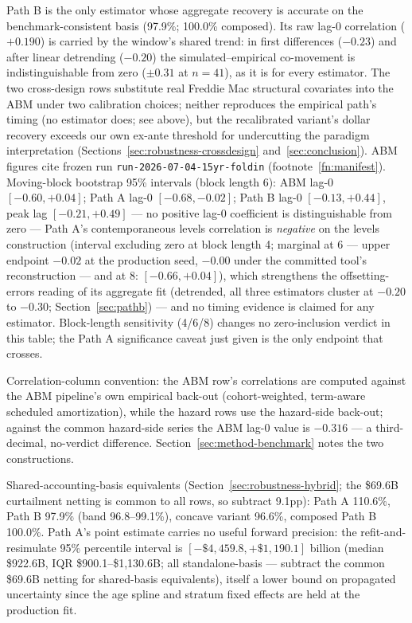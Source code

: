 \documentclass[12pt]{article}
\begin{document}
\begin{table}[t]
\begin{threeparttable}
\begin{tablenotes}[flushleft]
\item Path B is the only estimator whose aggregate recovery is accurate on the benchmark-consistent basis (97.9\%; 100.0\% composed). Its raw lag-0 correlation ($+0.190$) is carried by the window's shared trend: in first differences ($-0.23$) and after linear detrending ($-0.20$) the simulated--empirical co-movement is indistinguishable from zero ($\pm 0.31$ at $n = 41$), as it is for every estimator. The two cross-design rows substitute real Freddie Mac structural covariates into the ABM under two calibration choices; neither reproduces the empirical path's timing (no estimator does; see above), but the recalibrated variant's dollar recovery exceeds our own ex-ante threshold for undercutting the paradigm interpretation (Sections~\ref{sec:robustness-crossdesign} and~\ref{sec:conclusion}). ABM figures cite frozen run \texttt{run-2026-07-04-15yr-foldin} (footnote~\ref{fn:manifest}). Moving-block bootstrap 95\% intervals (block length 6): ABM lag-0 $[-0.60, +0.04]$; Path A lag-0 $[-0.68, -0.02]$; Path B lag-0 $[-0.13, +0.44]$, peak lag $[-0.21, +0.49]$ --- no positive lag-0 coefficient is distinguishable from zero --- Path A's contemporaneous levels correlation is \emph{negative} on the levels construction (interval excluding zero at block length 4; marginal at 6 --- upper endpoint $-0.02$ at the production seed, $-0.00$ under the committed tool's reconstruction --- and at 8: $[-0.66, +0.04]$), which strengthens the offsetting-errors reading of its aggregate fit (detrended, all three estimators cluster at $-0.20$ to $-0.30$; Section~\ref{sec:pathb}) --- and no timing evidence is claimed for any estimator. Block-length sensitivity (4/6/8) changes no zero-inclusion verdict in this table; the Path A significance caveat just given is the only endpoint that crosses.
\item Correlation-column convention: the ABM row's correlations are computed against the ABM pipeline's own empirical back-out (cohort-weighted, term-aware scheduled amortization), while the hazard rows use the hazard-side back-out; against the common hazard-side series the ABM lag-0 value is $-0.316$ --- a third-decimal, no-verdict difference. Section~\ref{sec:method-benchmark} notes the two constructions.
\item Shared-accounting-basis equivalents (Section~\ref{sec:robustness-hybrid}; the \$69.6B curtailment netting is common to all rows, so subtract 9.1pp): Path A 110.6\%, Path B 97.9\% (band 96.8--99.1\%), concave variant 96.6\%, composed Path B 100.0\%. Path A's point estimate carries no useful forward precision: the refit-and-resimulate 95\% percentile interval is $[-\$4{,}459.8, +\$1{,}190.1]$ billion (median \$922.6B, IQR \$900.1--\$1{,}130.6B; all standalone-basis --- subtract the common \$69.6B netting for shared-basis equivalents), itself a lower bound on propagated uncertainty since the age spline and stratum fixed effects are held at the production fit.
\end{tablenotes}
\end{threeparttable}
\end{table}
\end{document}

